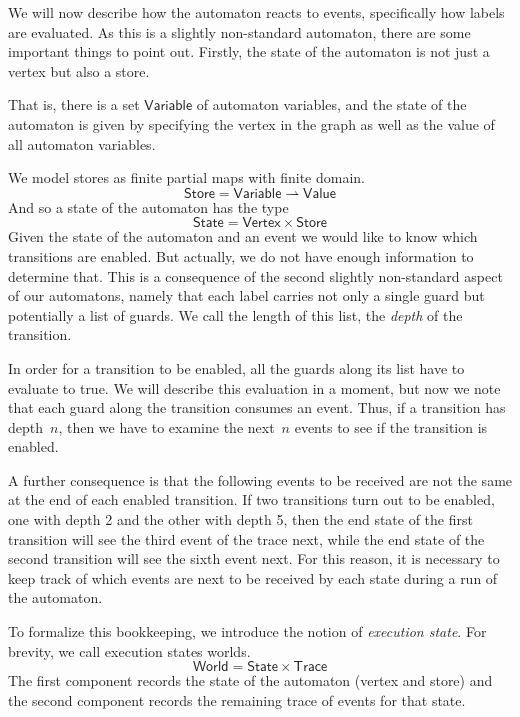 \documentclass[preprint]{sigplanconf} %
\newcommand{\pmap}{\rightharpoonup}
\newcommand{\set}[1]{\ensuremath{\mathsf{#1}}}
\theoremstyle{definition}
\theoremstyle{remark}
\begin{document}
We will now describe how the automaton reacts to events, specifically
how labels are evaluated. As this is a slightly non-standard
automaton, there are some important things to point out. Firstly, the
state of the automaton is not just a vertex but also a store. 

That is, there is a set $\set{Variable}$ of automaton variables, and the state of the automaton is
given by specifying the vertex in the graph as well as the value of
all automaton variables.

We model stores as finite partial maps with finite domain.
\[
\set{Store} = \set{Variable} \pmap \set{Value}
\]
And so a state of the automaton has the type
\[
\set{State} = \set{Vertex}\times\set{Store}
\]
Given the state of the automaton and an event we would like to know
which transitions are enabled. But actually, we do not have enough
information to determine that. This is a consequence of the second
slightly non-standard aspect of our automatons, namely that each label
carries not only a single guard but potentially a list of guards.
We call the length of this list, the \emph{depth} of the transition.

In order for a transition to be enabled, all the guards along its
list have to evaluate to true. We will describe this evaluation in a
moment, but now we note that each guard along the transition consumes
an event.
Thus, if a transition has depth~$n$, then we have to examine the next~$n$ events to see if the transition is enabled.

A further consequence is that the following events to be received are
not the same at the end of each enabled transition. If two transitions
turn out to be enabled, one with depth 2 and the other with depth 5,
then the end state of the first transition will see the third event of
the trace next, while the end state of the second transition will see
the sixth event next. For this reason, it is necessary to keep track
of which events are next to be received by each state during a run of
the automaton.

To formalize this bookkeeping, we introduce the notion of
\emph{execution state}. For brevity, we call execution states worlds.
\[
\set{World} = \set{State}\times\set{Trace}
\]
The first component records the state of the automaton (vertex
and store) and the second component records the remaining trace of
events for that state.
\end{document}
